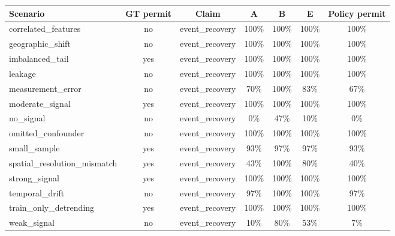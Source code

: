 \begin{tabular}{lcccccc}
\toprule
Scenario & GT permit & Claim & A & B & E & Policy permit \\
\midrule
correlated\_features & no & event\_recovery & 100\% & 100\% & 100\% & 100\% \\
geographic\_shift & no & event\_recovery & 100\% & 100\% & 100\% & 100\% \\
imbalanced\_tail & yes & event\_recovery & 100\% & 100\% & 100\% & 100\% \\
leakage & no & event\_recovery & 100\% & 100\% & 100\% & 100\% \\
measurement\_error & no & event\_recovery & 70\% & 100\% & 83\% & 67\% \\
moderate\_signal & yes & event\_recovery & 100\% & 100\% & 100\% & 100\% \\
no\_signal & no & event\_recovery & 0\% & 47\% & 10\% & 0\% \\
omitted\_confounder & no & event\_recovery & 100\% & 100\% & 100\% & 100\% \\
small\_sample & yes & event\_recovery & 93\% & 97\% & 97\% & 93\% \\
spatial\_resolution\_mismatch & yes & event\_recovery & 43\% & 100\% & 80\% & 40\% \\
strong\_signal & yes & event\_recovery & 100\% & 100\% & 100\% & 100\% \\
temporal\_drift & no & event\_recovery & 97\% & 100\% & 100\% & 97\% \\
train\_only\_detrending & yes & event\_recovery & 100\% & 100\% & 100\% & 100\% \\
weak\_signal & no & event\_recovery & 10\% & 80\% & 53\% & 7\% \\
\bottomrule
\end{tabular}
